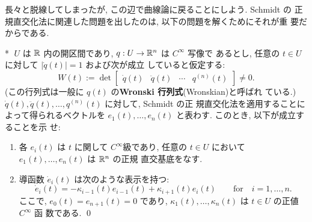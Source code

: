 \documentclass[12pt,twoside]{jarticle}
\def\qstar#1{$\!\!\!$#1$\;$}
\begin{document}

\medskip

長々と脱線してしまったが, この辺で曲線論に戻ることにしよう. Schmidt の
正規直交化法に関連した問題を出したのは, 以下の問題を解くためにそれが重
要だからである.

\begin{question}\qstar{*}
  $U$ は ${\mathbb R}$ 内の開区間であり, $q : U \to {\mathbb R}^n$ は $C^\infty$ 写像で
  あるとし, 任意の $t\in U$ に対して $|\dot{q}(t)| = 1$ および次が成立
  していると仮定する:
  \[
    W(t) := 
    \det
    \begin{bmatrix}
      \dot{q}(t) & \ddot{q}(t) & \cdots & q^{(n)}(t)
    \end{bmatrix}
    \ne 0.
  \]%
  (この行列式は一般に $q(t)$ の{\bf Wronski 行列式}(Wronskian)と呼ばれ
  ている.) %
  $\dot{q}(t), \ddot{q}(t), \dots, q^{(n)}(t)$ に対して, Schmidt の正
  規直交化法を適用することによって得られるベクトルを %
  $e_1(t), \ldots, e_n(t)$ と表わす. このとき, 以下が成立することを示
  せ:
  \begin{enumerate}
  \item 各 $e_i(t)$ は $t$ に関して $C^\infty$級であり, %
    任意の $t\in U$ において $e_1(t), \dots, e_n(t)$ は ${\mathbb R}^n$ の正規
    直交基底をなす.
  \item 導函数 $\dot{e}_i(t)$ は次のような表示を持つ:
    \[
      \dot{e}_i(t)
      = - \kappa_{i-1}(t) e_{i-1}(t) + \kappa_{i+1}(t)e_i(t)
      \qquad\text{for}\quad
      i = 1, \dots, n.
    \]
    ここで, $e_0(t) = e_{n+1}(t) = 0$ であり, %
    $\kappa_1(t), \dots, \kappa_n(t)$ は $t\in U$ の正値 $C^\infty$ 函
    数である. \qed
  \end{enumerate}
\end{question}
\end{document}
